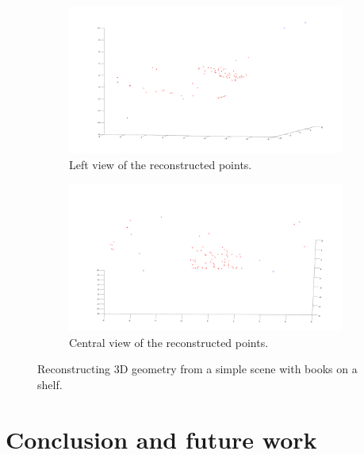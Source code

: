 \documentclass[12pt]{article}
\begin{document}
\begin{figure}[htbp]
		\ContinuedFloat
		\centering        
        \begin{subfigure}[b]{0.45\textwidth}
                \includegraphics[width=\textwidth]{images/reconstruction3}
                \caption{Left view of the reconstructed points.}
                \label{fig:stereoRecons2}
        \end{subfigure}
        \begin{subfigure}[b]{0.45\textwidth}
                \includegraphics[width=\textwidth]{images/reconstruction2}
                \caption{Central view of the reconstructed points.}
                \label{fig:stereoRecons3}
        \end{subfigure}
        \caption{Reconstructing 3D geometry from a simple scene with books on a shelf.}\label{fig:stereoReconstruction}
\end{figure}

\FloatBarrier
\section{Conclusion and future work}
\end{document}
